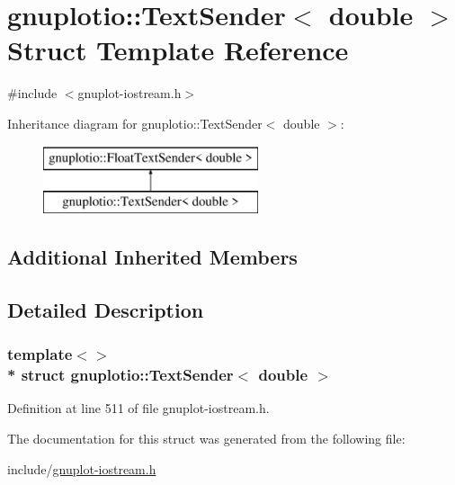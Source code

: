 \hypertarget{structgnuplotio_1_1_text_sender_3_01double_01_4}{}\section{gnuplotio\+:\+:Text\+Sender$<$ double $>$ Struct Template Reference}
\label{structgnuplotio_1_1_text_sender_3_01double_01_4}


{\ttfamily \#include $<$gnuplot-\/iostream.\+h$>$}

Inheritance diagram for gnuplotio\+:\+:Text\+Sender$<$ double $>$\+:\begin{figure}[H]
\begin{center}
\leavevmode
\includegraphics[height=2.000000cm]{structgnuplotio_1_1_text_sender_3_01double_01_4}
\end{center}
\end{figure}
\subsection*{Additional Inherited Members}


\subsection{Detailed Description}
\subsubsection*{template$<$$>$\\*
struct gnuplotio\+::\+Text\+Sender$<$ double $>$}



Definition at line 511 of file gnuplot-\/iostream.\+h.



The documentation for this struct was generated from the following file\+:\begin{DoxyCompactItemize}
\item 
include/\hyperlink{gnuplot-iostream_8h}{gnuplot-\/iostream.\+h}\end{DoxyCompactItemize}
